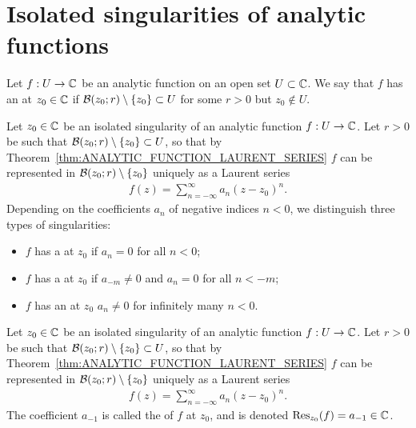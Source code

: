 \section{Isolated singularities of analytic functions}

\begin{definition}
  \label{def:isolated_singularity}
  Let $f : U \to \bC$ be an analytic function on an open set $U \subset \bC$.
  We say that $f$ has an  at $z_0 \in \bC$ if
  $\BallRC{r}{z_0} \setminus \set{z_0} \subset U$ for some $r>0$ but $z_0 \notin U$.
\end{definition}

\begin{definition}
  \label{def:singularity_classification}
  Let $z_0 \in \bC$ be an isolated singularity of
  an analytic function $f : U \to \bC$.
  Let $r > 0$ be such that $\BallRC{r}{z_0} \setminus \set{z_0} \subset U$,
  so that by Theorem~\ref{thm:ANALYTIC_FUNCTION_LAURENT_SERIES}
  $f$ can be represented in $\BallRC{r}{z_0} \setminus \set{z_0}$
  uniquely as a Laurent series
  \begin{align*}
    f(z) = \sum_{n=-\infty}^\infty a_n (z - z_0)^n .
  \end{align*}
  Depending on the coefficients $a_n$ of negative indices $n < 0$,
  we distinguish three types of singularities:
  \begin{itemize}
    \item $f$ has a  at $z_0$ if $a_n = 0$ for all $n < 0$;
    \item $f$ has a  at $z_0$
      if $a_{-m} \ne 0$ and $a_n = 0$ for all $n < -m$;
    \item $f$ has an  at $z_0$
      $a_n \ne 0$ for infinitely many $n < 0$.
  \end{itemize}
\end{definition}

\begin{definition}
  \label{def:residue}
  Let $z_0 \in \bC$ be an isolated singularity of
  an analytic function $f : U \to \bC$.
  Let $r > 0$ be such that $\BallRC{r}{z_0} \setminus \set{z_0} \subset U$,
  so that by Theorem~\ref{thm:ANALYTIC_FUNCTION_LAURENT_SERIES}
  $f$ can be represented in $\BallRC{r}{z_0} \setminus \set{z_0}$
  uniquely as a Laurent series
  \begin{align*}
    f(z) = \sum_{n=-\infty}^\infty a_n (z - z_0)^n .
  \end{align*}
  The coefficient $a_{-1}$ is called the  of $f$ at $z_0$,
  and is denoted $\ResAtOf{z_0}{f} = a_{-1} \in \bC$.
\end{definition}

